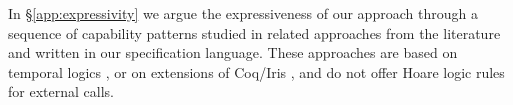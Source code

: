 \newcommand{\paragraphSDD}[1]{\vspace{.02cm}{\textit{#1}}}
 
In  \S \ref{app:expressivity} we argue the expressiveness of our approach  through a sequence of capability patterns studied in related approaches from the literature  
 \cite{OOPSLA22,dd,VerX,irisWasm23,ddd} and written in our specification language.
These approaches %
 are based on temporal logics \cite{VerX,OOPSLA22}, or on extensions of Coq/Iris \cite{dd,irisWasm23,ddd}, and do not
offer Hoare logic  rules  for external calls.

 

